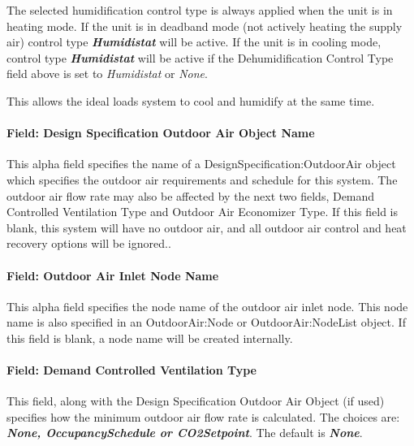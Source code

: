 The selected humidification control type is always applied when the unit is in heating mode. If the unit is in deadband mode (not actively heating the supply air) control type \textbf{\emph{Humidistat}} will be active. If the unit is in cooling mode, control type \textbf{\emph{Humidistat}} will be active if the Dehumidification Control Type field above is set to \emph{Humidistat} or \emph{None}.

This allows the ideal loads system to cool and humidify at the same time.

\paragraph{Field: Design Specification Outdoor Air Object Name}\label{field-design-specification-outdoor-air-object-name-002}

This alpha field specifies the name of a DesignSpecification:OutdoorAir object which specifies the outdoor air requirements and schedule for this system. The outdoor air flow rate may also be affected by the next two fields, Demand Controlled Ventilation Type and Outdoor Air Economizer Type. If this field is blank, this system will have no outdoor air, and all outdoor air control and heat recovery options will be ignored..

\paragraph{Field: Outdoor Air Inlet Node Name}\label{field-outdoor-air-inlet-node-name-002}

This alpha field specifies the node name of the outdoor air inlet node. This node name is also specified in an OutdoorAir:Node or OutdoorAir:NodeList object. If this field is blank, a node name will be created internally.

\paragraph{Field: Demand Controlled Ventilation Type}\label{field-demand-controlled-ventilation-type-000}

This field, along with the Design Specification Outdoor Air Object (if used) specifies how the minimum outdoor air flow rate is calculated. The choices are: \textbf{\emph{None, OccupancySchedule or CO2Setpoint}}. The default is \textbf{\emph{None}}.

